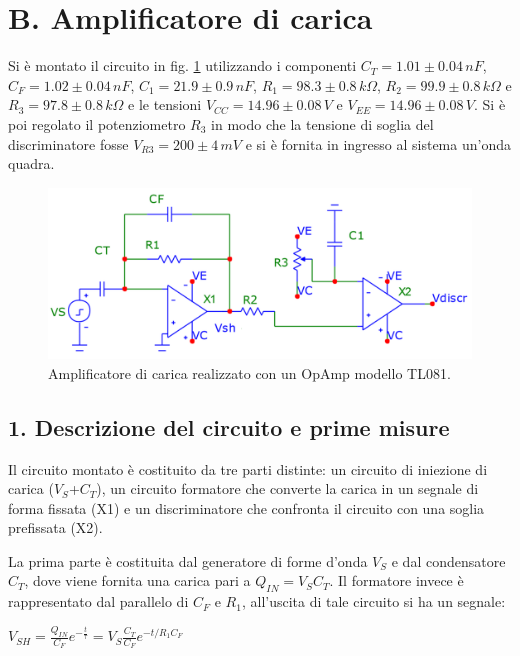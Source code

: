 \documentclass[10pt,a4paper]{article}
\begin{document}
\section*{B. Amplificatore di carica}

Si è montato il circuito in fig. \ref{circuito2} utilizzando i componenti $C_T = 1.01\pm0.04 \, nF$, $C_F = 1.02 \pm 0.04 \, nF$, $C_1 = 21.9 \pm 0.9 \, nF$, $R_1 = 98.3 \pm 0.8 \, k \Omega$, $R_2 = 99.9 \pm 0.8 \, k\Omega$ e $R_3 = 97.8 \pm 0.8 \, k \Omega$ e le tensioni $V_{CC} = 14.96\pm0.08 \, V$ e $V_{EE} = 14.96 \pm 0.08 \, V$. Si è poi regolato il potenziometro $R_3$ in modo che la tensione di soglia del discriminatore fosse $V_{R3} = 200 \pm 4 \, mV$ e si è fornita in ingresso al sistema un'onda quadra.\\

\begin{figure}[htb!]
\centering
\includegraphics[scale=0.5]{amplificatoreCarica.png}
\caption{Amplificatore di carica realizzato con un OpAmp modello TL081.\label{circuito2}}
\end{figure}

\subsection*{1. Descrizione del circuito e prime misure}
Il circuito montato è costituito da tre parti distinte: un circuito di iniezione di carica ($V_S$+$C_T$), un circuito formatore che converte la carica in un segnale di forma fissata (X1) e un discriminatore che confronta il circuito con una soglia prefissata (X2).

La prima parte è costituita dal generatore di forme d'onda $V_S$ e dal condensatore $C_T$, dove viene fornita una carica pari a $Q_{IN}=V_S C_T$. Il formatore invece è rappresentato dal parallelo di $C_F$ e $R_1$, all'uscita di tale circuito si ha un segnale:\\
\begin{center}
$V_{SH}=\frac{Q_{IN}}{C_F} e^{-\frac{t}{\tau}} = V_S \frac{C_T}{C_F} e^{-t/R_1 C_F}$\\
\end{center}
\end{document}
